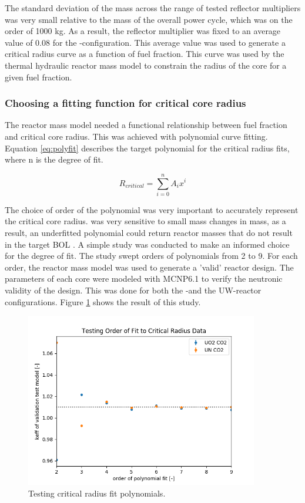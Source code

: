 The standard deviation of the mass across the range of tested reflector
multipliers was very small relative to the mass of the overall power cycle,
which was on the order of 1000 kg. As a result, the reflector multiplier was fixed to an
average value of 0.08 for the \uox-\codiox configuration. 
This average value was used to generate a critical radius
curve as a function of fuel fraction. This curve was used by the thermal
hydraulic reactor mass model to constrain the radius of the core for a given
fuel fraction. 


\subsubsection{Choosing a fitting function for critical core radius}
The reactor mass model needed a functional relationship between fuel fraction
and critical core radius. This was achieved with polynomial curve fitting.
Equation \ref{eq:polyfit} describes the target polynomial for the critical
radius fits, where n is the degree of fit.

\begin{equation}
    R_{critical} = \sum_{i=0}^n A_ix^i
    \label{eq:polyfit}
\end{equation}

The choice of order of the polynomial was very important to accurately represent the
critical core radius. \keff was very sensitive to small mass changes in mass, as
a result, an underfitted polynomial could return reactor masses that do not
result in the target BOL \keff. A simple study was conducted to make an informed
choice for the degree of fit. The study swept orders of polynomials from 2 to 9.
For each order, the reactor mass model was used to generate a 'valid' reactor
design. The parameters of each core were modeled with MCNP6.1 to verify the
neutronic validity of the design. This was done for both the \uox-\codiox and
the UW-\codiox reactor configurations. Figure \ref{fig:fit_order_test} shows the
result of this study.

\begin{figure}[h]
    \centering
    \includegraphics[width=4in]{../images/poly_order_test.png}
\caption{Testing critical radius fit polynomials.}
\label{fig:fit_order_test}
\end{figure}

